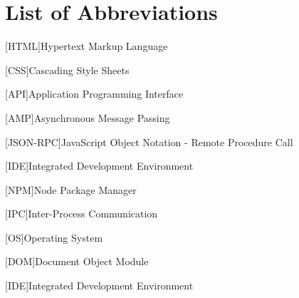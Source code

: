 \section{List of Abbreviations}
\label{sec:list-of-abbreviations}
\hfill
\begin{acronym}
    [HTML]{Hypertext Markup Language}
\end{acronym}

\begin{acronym}
    [CSS]{Cascading Style Sheets}
\end{acronym}

\begin{acronym}
    [API]{Application Programming Interface}
\end{acronym}

\begin{acronym}
    [AMP]{Asynchronous Message Passing}
\end{acronym}

\begin{acronym}
    [JSON-RPC]{JavaScript Object Notation - Remote Procedure Call}
\end{acronym}

\begin{acronym}
    [IDE]{Integrated Development Environment}
\end{acronym}

\begin{acronym}
    [NPM]{Node Package Manager}
\end{acronym}

\begin{acronym}
    [IPC]{Inter-Process Communication}
\end{acronym}

\begin{acronym}
    [OS]{Operating System}
\end{acronym}


\begin{acronym}
    [DOM]{Document Object Module}
\end{acronym}

\begin{acronym}
    [IDE]{Integrated Development Environment}
\end{acronym}

